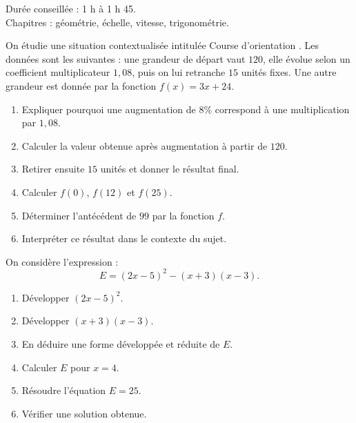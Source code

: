 \documentclass[11pt,a4paper]{article}
\newcounter{exercice}
\begin{document}
\begin{objectif}
Durée conseillée : 1 h à 1 h 45.\\
Chapitres : géométrie, échelle, vitesse, trigonométrie.
\end{objectif}
\begin{exercice}
On étudie une situation contextualisée intitulée \og Course d'orientation \fg. Les données sont les suivantes : une grandeur de départ vaut $120$, elle évolue selon un coefficient multiplicateur $1{,}08$, puis on lui retranche $15$ unités fixes. Une autre grandeur est donnée par la fonction $f(x)=3x+24$.
\begin{enumerate}
  \item Expliquer pourquoi une augmentation de $8\%$ correspond à une multiplication par $1{,}08$.
  \item Calculer la valeur obtenue après augmentation à partir de $120$.
  \item Retirer ensuite $15$ unités et donner le résultat final.
  \item Calculer $f(0)$, $f(12)$ et $f(25)$.
  \item Déterminer l'antécédent de $99$ par la fonction $f$.
  \item Interpréter ce résultat dans le contexte du sujet.
\end{enumerate}
\end{exercice}

\begin{exercice}
On considère l'expression :
\[
E=(2x-5)^2-(x+3)(x-3).
\]
\begin{enumerate}
  \item Développer $(2x-5)^2$.
  \item Développer $(x+3)(x-3)$.
  \item En déduire une forme développée et réduite de $E$.
  \item Calculer $E$ pour $x=4$.
  \item Résoudre l'équation $E=25$.
  \item Vérifier une solution obtenue.
\end{enumerate}
\end{exercice}
\end{document}
